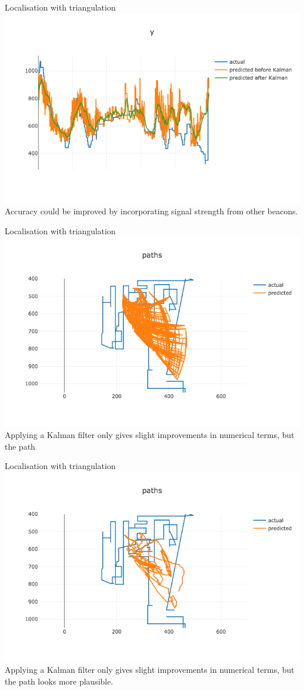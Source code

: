 \documentclass[landscape]{infslides}
\begin{document}
\begin{slide}{Localisation with triangulation}
\includegraphics[width=\linewidth]{images/trilateration_y.png}
Accuracy could be improved by incorporating signal strength from other beacons.
\end{slide}

\begin{slide}{Localisation with triangulation}
\includegraphics[width=\linewidth]{images/trilateration_path_no_kalman.png}
Applying a Kalman filter only gives slight improvements in numerical terms, but the path 
\end{slide}

\begin{slide}{Localisation with triangulation}
\includegraphics[width=\linewidth]{images/trilateration_path.png}
Applying a Kalman filter only gives slight improvements in numerical terms, but the path looks more plausible.
\end{slide}
\end{document}
